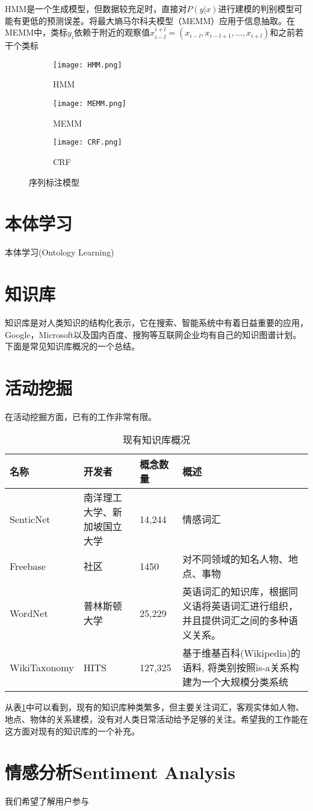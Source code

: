 HMM是一个生成模型，但数据较充足时，直接对$P(y|x)$进行建模的判别模型可能有更低的预测误差。\cite{mccallum2000maximum}将最大熵马尔科夫模型（MEMM）应用于信息抽取。在MEMM中，类标$y_i$依赖于附近的观察值$x_{i - l}^{i + l} = ({x_{i - l}},{x_{i - l + 1}}, \ldots ,{x_{i + l}})$和之前若干个类标

\begin{figure}[h]
\centering
\begin{subfigure}{0.3\textwidth}
\texttt{[image: HMM.png]}
\caption{HMM}
\end{subfigure}
\qquad
\begin{subfigure}{0.3\textwidth}
\texttt{[image: MEMM.png]}
\caption{MEMM}
\end{subfigure}
\qquad
\begin{subfigure}{0.3\textwidth}
\texttt{[image: CRF.png]}
\caption{CRF}
\end{subfigure}

\caption{序列标注模型}
\label{fig:seq_label_model}
\end{figure}


\section{本体学习}
本体学习(Ontology Learning)


\section{知识库}
知识库是对人类知识的结构化表示，它在搜索、智能系统中有着日益重要的应用，Google，Microsoft以及国内百度、搜狗等互联网企业均有自己的知识图谱计划。下面是常见知识库概况的一个总结。
\section{活动挖掘}
在活动挖掘方面，已有的工作非常有限。

\begin{table}[!h]
\begin{tabular}[0.7\textwidth]{|l|p{2cm}|l|p{4cm}|}
\hline
名称 & 开发者 & 概念数量  & 概述 \\
\hline
SenticNet & 南洋理工大学、新加坡国立大学 & 14,244	& 情感词汇  \\
\hline
Freebase & 社区	& 1450	& 对不同领域的知名人物、地点、事物 \\
\hline
WordNet\cite{miller1995wordnet} & 普林斯顿大学 & 25,229 & 英语词汇的知识库，根据同义语将英语词汇进行组织，并且提供词汇之间的多种语义关系。 \\
\hline
WikiTaxonomy\cite{ponzetto2007deriving}	& HITS & 127,325 & 基于维基百科(Wikipedia)的语料, 将类别按照is-a关系构建为一个大规模分类系统 \\
\hline
\end{tabular}
\caption{现有知识库概况}
\label{table:knowledge_base}
\end{table}

从表\ref{table:knowledge_base}中可以看到，现有的知识库种类繁多，但主要关注词汇，客观实体如人物、地点、物体的关系建模，没有对人类日常活动给予足够的关注。希望我的工作能在这方面对现有的知识库的一个补充。

\section{情感分析Sentiment Analysis}
我们希望了解用户参与
